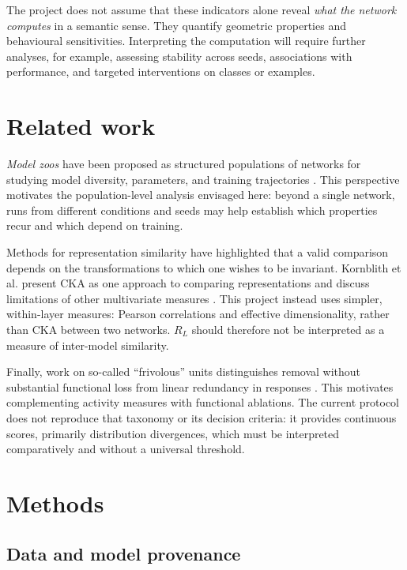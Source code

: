 \documentclass[11pt,a4paper]{article}
\begin{document}
The project does not assume that these indicators alone reveal \emph{what the network computes} in a semantic sense. They quantify geometric properties and behavioural sensitivities. Interpreting the computation will require further analyses, for example, assessing stability across seeds, associations with performance, and targeted interventions on classes or examples.

\section{Related work}

\emph{Model zoos} have been proposed as structured populations of networks for studying model diversity, parameters, and training trajectories \citep{schurholt2022modelzoos}. This perspective motivates the population-level analysis envisaged here: beyond a single network, runs from different conditions and seeds may help establish which properties recur and which depend on training.

Methods for representation similarity have highlighted that a valid comparison depends on the transformations to which one wishes to be invariant. Kornblith et al. present CKA as one approach to comparing representations and discuss limitations of other multivariate measures \citep{kornblith2019similarity}. This project instead uses simpler, within-layer measures: Pearson correlations and effective dimensionality, rather than CKA between two networks. $R_L$ should therefore not be interpreted as a measure of inter-model similarity.

Finally, work on so-called “frivolous” units distinguishes removal without substantial functional loss from linear redundancy in responses \citep{casper2021frivolous}. This motivates complementing activity measures with functional ablations. The current protocol does not reproduce that taxonomy or its decision criteria: it provides continuous scores, primarily distribution divergences, which must be interpreted comparatively and without a universal threshold.

\section{Methods}

\subsection{Data and model provenance}
\end{document}
